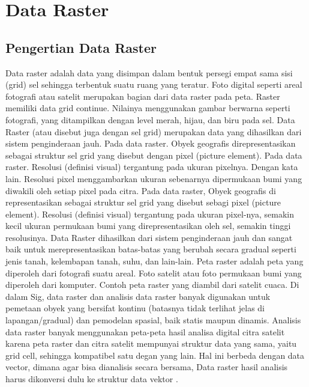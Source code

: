 
\section{Data Raster}
\subsection{Pengertian Data Raster}
Data raster \cite{puntodewo2003sistem} adalah data yang disimpan dalam bentuk persegi empat sama sisi (grid) sel sehingga terbentuk suatu ruang yang 
teratur. Foto digital seperti areal fotografi atau satelit merupakan bagian dari data raster pada peta. 
Raster memiliki data grid continue. Nilainya menggunakan gambar berwarna seperti fotografi, yang ditampilkan dengan 
level merah, hijau, dan biru pada sel. Data Raster (atau disebut juga dengan sel grid) merupakan data yang 
dihasilkan dari sistem penginderaan jauh. Pada data raster. Obyek geografis direpresentasikan sebagai struktur
sel grid yang disebut dengan pixel (picture element). Pada data raster. Resolusi (definisi visual) tergantung
pada ukuran pixelnya. Dengan kata lain. Resolusi pixel menggambarkan ukuran sebenarnya dipermukaan bumi 
yang diwakili oleh setiap pixel pada citra. Pada data raster, Obyek geografis di representasikan sebagai struktur sel grid yang disebut sebagi pixel (picture element). Resolusi (definisi visual) tergantung pada ukuran pixel-nya, semakin kecil ukuran permukaan bumi yang direpresentasikan oleh sel, semakin tinggi resolusinya. Data Raster dihasilkan dari sistem penginderaan jauh dan sangat baik untuk merepresentasikan batas-batas yang berubah secara gradual seperti jenis tanah, kelembapan tanah, suhu, dan lain-lain. Peta raster adalah peta yang diperoleh dari fotografi suatu areal. Foto satelit atau foto permukaan bumi yang diperoleh dari komputer. Contoh peta raster yang diambil dari satelit cuaca. Di dalam Sig, data raster dan analisis data raster banyak digunakan untuk pemetaan obyek yang bersifat kontinu (batasnya tidak terlihat jelas di lapangan/gradual) dan pemodelan spasial, baik statis maupun dinamis. Analisis data raster banyak menggunakan peta-peta hasil analisa digital citra satelit karena peta raster dan citra satelit mempunyai struktur data yang sama, yaitu grid cell, sehingga kompatibel satu degan yang lain. Hal ini berbeda dengan data vector, dimana agar bisa dianalisis secara bersama, Data raster hasil analisis harus dikonversi dulu ke struktur data vektor \cite{puntodewo2003sistem}.

